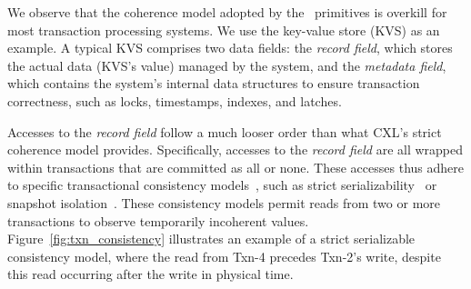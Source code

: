 


We observe that the coherence model adopted by the \vanilla~primitives is overkill for most transaction processing systems. We use the key-value store (KVS) as an example. A typical KVS comprises two data fields: the \textit{record field}, which stores the actual data (KVS's value) managed by the system, and the \textit{metadata field}, which contains the system's internal data structures to ensure transaction correctness, such as locks, timestamps, indexes, and latches.



Accesses to the \textit{record field} follow a much looser order than what CXL's strict coherence model provides.
Specifically, accesses to the \textit{record field} are all wrapped within transactions that are committed as all or none. These accesses thus adhere to specific transactional consistency models~\cite{rss_sosp21}, such as strict serializability~\cite{tcc_isca04} or snapshot isolation~\cite{sitm_asplos14}. These consistency models permit reads from two or more transactions to observe temporarily incoherent values. Figure~\ref{fig:txn_consistency} illustrates an example of a strict serializable consistency model, where the read from Txn-4 precedes Txn-2's write, despite this read occurring after the write in physical time. 


